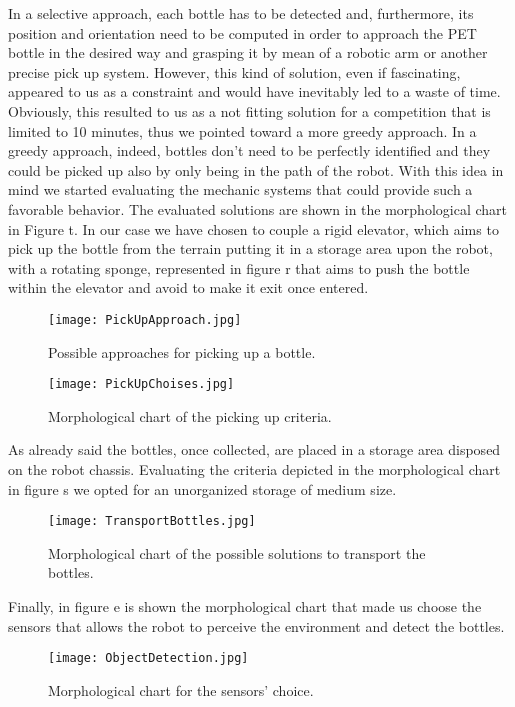 In a selective approach, each bottle has to be detected and, furthermore, its position and orientation need to be computed in order to approach the PET bottle in the desired way and grasping it by mean of a robotic arm or another precise pick up system.
However, this kind of solution, even if fascinating, appeared to us as a constraint and would have inevitably led to a waste of time. Obviously, this resulted to us as a not fitting solution for a competition that is limited to 10 minutes, thus we pointed toward a more greedy approach.
In a greedy approach, indeed, bottles don’t need to be perfectly identified and they could be picked up also by only being in the path of the robot.
With this idea in mind we started evaluating the mechanic systems that could provide such a favorable behavior.
The evaluated solutions are shown in the morphological chart in Figure t.
In our case we have chosen to couple a rigid elevator, which aims to pick up the bottle from the terrain putting it in a storage area upon the robot, with a rotating sponge, represented in figure r that aims to push the bottle within the elevator and avoid to make it exit once entered. 

\begin{figure}[H]
 \centering
 \texttt{[image: PickUpApproach.jpg]}
 \caption{Possible approaches for picking up a bottle.}
\label{fig:PickUpApproach}
\end{figure}

\begin{figure}[H]
 \centering
 \texttt{[image: PickUpChoises.jpg]}
 \caption{Morphological chart of the picking up criteria.}
\label{fig:PickUpChoises}
\end{figure}

As already said the bottles, once collected, are placed in a storage area disposed on the robot chassis. Evaluating the criteria depicted in the morphological chart in figure s we opted for an unorganized storage of medium size.
\begin{figure}[H]
 \centering
 \texttt{[image: TransportBottles.jpg]}
 \caption{Morphological chart of the possible solutions to transport the bottles.}
\label{fig:TransportBottles}
\end{figure}

Finally, in figure e is shown the morphological chart that made us choose the sensors that allows the robot to perceive the environment and detect the bottles.                                                
\begin{figure}[H]
 \centering
 \texttt{[image: ObjectDetection.jpg]}
 \caption{Morphological chart for the sensors' choice.}
\label{fig:ObjectDetection}
\end{figure}

